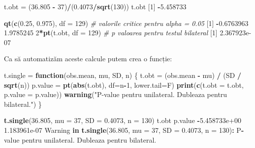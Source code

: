 \documentclass[]{article}
\newenvironment{Shaded}{\begin{snugshade}}{\end{snugshade}}
\newcommand{\KeywordTok}[1]{\textcolor[rgb]{0.13,0.29,0.53}{\textbf{#1}}}
\newcommand{\DataTypeTok}[1]{\textcolor[rgb]{0.13,0.29,0.53}{#1}}
\newcommand{\DecValTok}[1]{\textcolor[rgb]{0.00,0.00,0.81}{#1}}
\newcommand{\FloatTok}[1]{\textcolor[rgb]{0.00,0.00,0.81}{#1}}
\newcommand{\StringTok}[1]{\textcolor[rgb]{0.31,0.60,0.02}{#1}}
\newcommand{\CommentTok}[1]{\textcolor[rgb]{0.56,0.35,0.01}{\textit{#1}}}
\newcommand{\ControlFlowTok}[1]{\textcolor[rgb]{0.13,0.29,0.53}{\textbf{#1}}}
\newcommand{\OperatorTok}[1]{\textcolor[rgb]{0.81,0.36,0.00}{\textbf{#1}}}
\newcommand{\NormalTok}[1]{#1}
\begin{document}
\begin{Shaded}
\begin{Highlighting}[]
\NormalTok{t.obt =}\StringTok{ }\NormalTok{(}\FloatTok{36.805} \OperatorTok{-}\StringTok{ }\DecValTok{37}\NormalTok{)}\OperatorTok{/}\NormalTok{(}\FloatTok{0.4073}\OperatorTok{/}\KeywordTok{sqrt}\NormalTok{(}\DecValTok{130}\NormalTok{))}
\NormalTok{t.obt}
\NormalTok{[}\DecValTok{1}\NormalTok{] }\OperatorTok{-}\FloatTok{5.458733}

\KeywordTok{qt}\NormalTok{(}\KeywordTok{c}\NormalTok{(}\FloatTok{0.25}\NormalTok{, }\FloatTok{0.975}\NormalTok{), }\DataTypeTok{df =} \DecValTok{129}\NormalTok{) }\CommentTok{# valorile critice pentru alpha = 0.05}
\NormalTok{[}\DecValTok{1}\NormalTok{] }\OperatorTok{-}\FloatTok{0.6763963}  \FloatTok{1.9785245}
\DecValTok{2}\OperatorTok{*}\KeywordTok{pt}\NormalTok{(t.obt, }\DataTypeTok{df =} \DecValTok{129}\NormalTok{) }\CommentTok{# p valoarea pentru testul bilateral}
\NormalTok{[}\DecValTok{1}\NormalTok{] }\FloatTok{2.367923e-07}
\end{Highlighting}
\end{Shaded}

Ca să automatizăm aceste calcule putem crea o funcție:

\begin{Shaded}
\begin{Highlighting}[]
\NormalTok{t.single =}\StringTok{ }\ControlFlowTok{function}\NormalTok{(obs.mean, mu, SD, n) \{}
\NormalTok{  t.obt =}\StringTok{ }\NormalTok{(obs.mean }\OperatorTok{-}\StringTok{ }\NormalTok{mu) }\OperatorTok{/}\StringTok{ }\NormalTok{(SD }\OperatorTok{/}\StringTok{ }\KeywordTok{sqrt}\NormalTok{(n))}
\NormalTok{  p.value =}\StringTok{ }\KeywordTok{pt}\NormalTok{(}\KeywordTok{abs}\NormalTok{(t.obt), }\DataTypeTok{df=}\NormalTok{n}\OperatorTok{-}\DecValTok{1}\NormalTok{, }\DataTypeTok{lower.tail=}\NormalTok{F)}
  \KeywordTok{print}\NormalTok{(}\KeywordTok{c}\NormalTok{(}\DataTypeTok{t.obt =}\NormalTok{ t.obt, }\DataTypeTok{p.value =}\NormalTok{ p.value))}
  \KeywordTok{warning}\NormalTok{(}\StringTok{"P-value pentru unilateral. Dubleaza pentru bilateral."}\NormalTok{)}
\NormalTok{\}}

\KeywordTok{t.single}\NormalTok{(}\FloatTok{36.805}\NormalTok{, }\DataTypeTok{mu =} \DecValTok{37}\NormalTok{, }\DataTypeTok{SD =} \FloatTok{0.4073}\NormalTok{, }\DataTypeTok{n =} \DecValTok{130}\NormalTok{)}
\NormalTok{        t.obt       p.value }
\OperatorTok{-}\FloatTok{5.458733e+00}  \FloatTok{1.183961e-07} 
\NormalTok{Warning }\ControlFlowTok{in} \KeywordTok{t.single}\NormalTok{(}\FloatTok{36.805}\NormalTok{, }\DataTypeTok{mu =} \DecValTok{37}\NormalTok{, }\DataTypeTok{SD =} \FloatTok{0.4073}\NormalTok{, }\DataTypeTok{n =} \DecValTok{130}\NormalTok{)}\OperatorTok{:}\StringTok{ }\NormalTok{P}\OperatorTok{-}\NormalTok{value pentru}
\NormalTok{unilateral. Dubleaza pentru bilateral.}
\end{Highlighting}
\end{Shaded}
\end{document}

